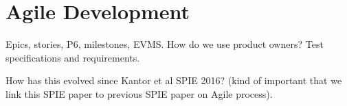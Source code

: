 \section{Agile Development}

Epics, stories, P6, milestones, EVMS.
How do we use product owners?
Test specifications and requirements.

How has this evolved since Kantor et al SPIE 2016\cite{2016SPIE.9911E..0NK}? (kind of important that we link this SPIE paper to previous SPIE paper on Agile process).
